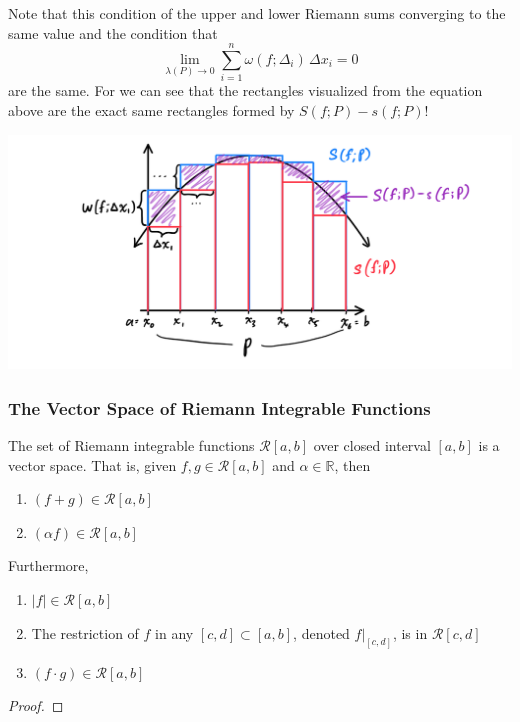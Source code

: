     Note that this condition of the upper and lower Riemann sums converging to the same value and the condition that 
    \[\lim_{\lambda(P) \rightarrow 0} \sum_{i = 1}^n \omega (f; \Delta_i) \, \Delta x_i = 0\]
    are the same. For we can see that the rectangles visualized from the equation above are the exact same rectangles formed by $S(f; P) - s(f; P)$! 
    \begin{center}
        \includegraphics[scale=0.3]{img/Equivalent_Conditions_for_Integrability.PNG}
    \end{center}

    \subsubsection{The Vector Space of Riemann Integrable Functions}

    \begin{theorem}
    The set of Riemann integrable functions $\mathcal{R}[a, b]$ over closed interval $[a, b]$ is a vector space. That is, given $f, g \in \mathcal{R}[a, b]$ and $\alpha \in \mathbb{R}$, then
    \begin{enumerate}
      \item $(f + g) \in \mathcal{R}[a, b]$ 
      \item $(\alpha f) \in \mathcal{R}[a, b]$
    \end{enumerate}
    Furthermore, 
    \begin{enumerate}
      \item $|f| \in \mathcal{R}[a, b]$
      \item The restriction of $f$ in any $[c, d] \subset [a, b]$, denoted $f \big|_{[c,d]}$, is in $\mathcal{R}[c,d]$
      \item $(f \cdot g) \in \mathcal{R}[a, b]$
    \end{enumerate}
    \end{theorem}
    \begin{proof}

    \end{proof}

